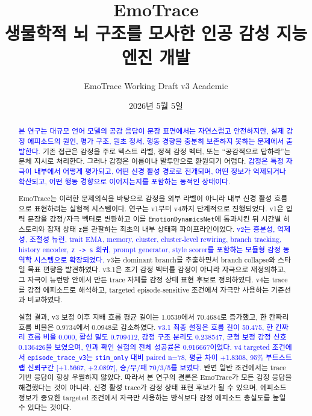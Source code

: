 ﻿\documentclass[11pt,a4paper]{article}
\title{\textbf{EmoTrace}\\
\large 생물학적 뇌 구조를 모사한 인공 감성 지능 엔진 개발}
\author{EmoTrace Working Draft v3 Academic}
\date{2026년 5월 5일}
\newcommand{\eng}[1]{\texttt{#1}}
\begin{document}
\onehalfspacing
\maketitle

\begin{abstract}
\textcolor{blue}{본 연구는 대규모 언어 모델의 공감 응답이 문장 표면에서는 자연스럽고 안전하지만, 실제 감정 에피소드의 원인, 평가 구조, 원초 정서, 행동 경향을 충분히 보존하지 못하는 문제에서 출발한다.} 기존 접근은 감정을 주로 텍스트 라벨, 정적 감정 벡터, 또는 ``공감적으로 답하라''는 문체 지시로 처리한다. 그러나 감정은 이름이나 말투만으로 환원되기 어렵다. \textcolor{blue}{감정은 특정 자극이 내부에서 어떻게 평가되고, 어떤 신경 활성 경로로 전개되며, 어떤 정보가 억제되거나 확산되고, 어떤 행동 경향으로 이어지는지를 포함하는 동적인 상태이다.}

EmoTrace는 이러한 문제의식을 바탕으로 감정을 외부 라벨이 아니라 내부 신경 활성 흐름으로 표현하려는 실험적 시스템이다. 연구는 v1부터 v4까지 단계적으로 진행되었다. v1은 입력 문장을 감정/자극 벡터로 변환하고 이를 \eng{EmotionDynamicsNet}에 통과시킨 뒤 시간별 히스토리와 잠재 상태 \eng{z}를 관찰하는 최초의 내부 상태화 파이프라인이었다. \textcolor{blue}{v2는 흥분성, 억제성, 조절성 뉴런, trait EMA, memory, cluster, cluster-level rewiring, branch tracking, history encoder, \eng{z -> s} 회귀, prompt generator, style scorer를 포함하는 모듈형 감정 동역학 시스템으로 확장되었다.} v3는 dominant branch를 추출하면서 branch collapse와 스타일 목표 편향을 발견하였다. v3.1은 초기 감정 벡터를 감정이 아니라 자극으로 재정의하고, 그 자극이 뉴런망 안에서 만든 trace 자체를 감정 상태 표현 후보로 정의하였다. v4는 trace를 감정 에피소드로 해석하고, targeted episode-sensitive 조건에서 자극만 사용하는 기준선과 비교하였다.

실험 결과, v3 보정 이후 지배 흐름 평균 길이는 1.0539에서 70.4684로 증가했고, 한 칸짜리 흐름 비율은 0.9734에서 0.0948로 감소하였다. \textcolor{blue}{v3.1 최종 설정은 흐름 길이 50.475, 한 칸짜리 흐름 비율 0.000, 활성 밀도 0.709412, 감정 구조 분리도 0.238547, 균형 보정 감정 신호 0.136426을 보였으며, 인과 확인 실험의 전체 성공률은 0.916667이었다.} \textcolor{blue}{v4 targeted 조건에서 \eng{episode\_trace\_v3}는 \eng{stim\_only} 대비 paired n=78, 평균 차이 +1.8308, 95\% 부트스트랩 신뢰구간 [+1.5667, +2.0897], 승/무/패 70/3/5를 보였다.} 반면 일반 조건에서는 trace 기반 응답이 항상 우월하지 않았다. 따라서 본 연구의 결론은 EmoTrace가 모든 감정 응답을 해결했다는 것이 아니라, 신경 활성 trace가 감정 상태 표현 후보가 될 수 있으며, 에피소드 정보가 중요한 targeted 조건에서 자극만 사용하는 방식보다 감정 에피소드 충실도를 높일 수 있다는 것이다.
\end{abstract}
\end{document}
